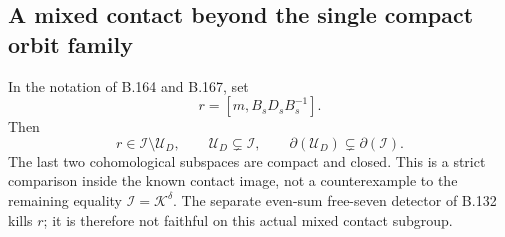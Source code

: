 \subsection*{A mixed contact beyond the single compact orbit family}
\label{stmt:B168}
In the notation of B.164 and B.167, set
\[
                     r=[m,B_sD_sB_s^{-1}].
\]
Then
\begin{equation}\label{eq:B168-strict}
 r\in\mathcal I\setminus\mathcal U_D,\qquad
 \mathcal U_D\subsetneq\mathcal I,\qquad
 \partial(\mathcal U_D)\subsetneq\partial(\mathcal I).
\end{equation}
The last two cohomological subspaces are compact and closed.
This is a strict comparison inside the known contact image, not a
counterexample to the remaining equality \(\mathcal I=\mathcal K^\delta\).
The separate even-sum free-seven detector of B.132 kills \(r\);
it is therefore not faithful on this actual mixed contact subgroup.

